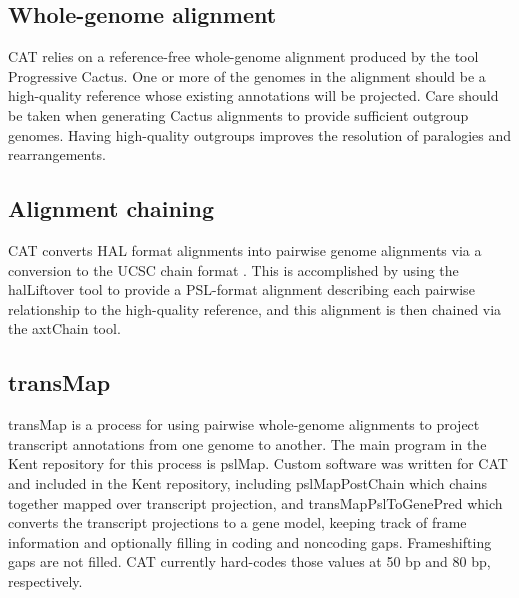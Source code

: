 \documentclass[fleqn,10pt]{wlscirep}
\begin{document}
\subsection*{Whole-genome alignment}
	CAT relies on a reference-free whole-genome alignment produced by the tool Progressive Cactus. One or more of the genomes in the alignment should be a high-quality reference whose existing annotations will be projected. Care should be taken when generating Cactus alignments to provide sufficient outgroup genomes. Having high-quality outgroups improves the resolution of paralogies and rearrangements.

\subsection*{Alignment chaining}
	CAT converts HAL format alignments into pairwise genome alignments via a conversion to the UCSC chain format \cite{kent2003evolution}. This is accomplished by using the halLiftover tool to provide a PSL-format alignment describing each pairwise relationship to the high-quality reference, and this alignment is then chained via the axtChain tool. 
  
\subsection*{transMap}
	transMap \cite{stanke2008using,zhu2007comparative} is a process for using pairwise whole-genome alignments to project transcript annotations from one genome to another. The main program in the Kent repository for this process is pslMap. Custom software was written for CAT and included in the Kent repository, including pslMapPostChain which chains together mapped over transcript projection, and transMapPslToGenePred which converts the transcript projections to a gene model, keeping track of frame information and optionally filling in coding and noncoding gaps. Frameshifting gaps are not filled. CAT currently hard-codes those values at 50 bp and 80 bp, respectively.
  
\end{document}
